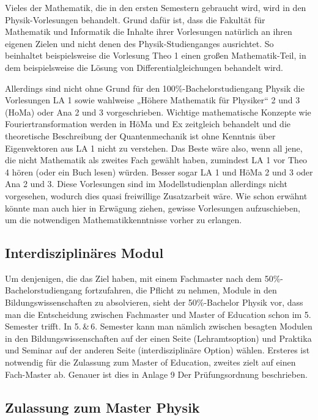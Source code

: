 Vieles der Mathematik, die in den ersten Semestern gebraucht wird, wird in den Physik-Vorlesungen behandelt. Grund dafür ist, dass die Fakultät für Mathematik und Informatik die Inhalte ihrer Vorlesungen natürlich an ihren eigenen Zielen und nicht denen des Physik-Studienganges ausrichtet. So beinhaltet beispielsweise die Vorlesung Theo 1 einen großen Mathematik-Teil, in dem beispielsweise die Lösung von Differentialgleichungen behandelt wird.

Allerdings sind nicht ohne Grund für den 100\%-Bachelorstudiengang Physik die Vorlesungen LA 1 sowie wahlweise „Höhere Mathematik für Physiker“ 2 und 3 (\gls{HoMa}) oder Ana 2 und 3 vorgeschrieben. Wichtige mathematische Konzepte wie Fouriertransformation werden in HöMa und Ex zeitgleich behandelt und die theoretische Beschreibung der Quantenmechanik ist ohne Kenntnis über Eigenvektoren aus LA 1 nicht zu verstehen. Das Beste wäre also, wenn all jene, die nicht Mathematik als zweites Fach gewählt haben, zumindest LA 1 vor Theo 4 hören (oder ein Buch lesen) würden. Besser sogar LA 1 und HöMa 2 und 3 oder Ana 2 und 3. Diese Vorlesungen sind im Modellstudienplan allerdings nicht vorgesehen, wodurch dies quasi freiwillige Zusatzarbeit wäre. Wie schon erwähnt könnte man auch hier in Erwägung ziehen, gewisse Vorlesungen aufzuschieben, um die notwendigen Mathematikkenntnisse vorher zu erlangen.


\subsection{Interdisziplinäres Modul}

Um denjenigen, die das Ziel haben, mit einem Fachmaster nach dem 50\%-Bachelorstudiengang fortzufahren, die Pflicht zu nehmen, Module in den Bildungswissenschaften zu absolvieren, sieht der 50\%-Bachelor Physik vor, dass man die Entscheidung zwischen Fachmaster und Master of Education schon im 5. Semester trifft. In 5.\,\&\,6. Semester kann man nämlich zwischen besagten Modulen in den Bildungswissenschaften auf der einen Seite (Lehramtsoption) und Praktika und Seminar auf der anderen Seite (interdisziplinäre Option) wählen. Ersteres ist notwendig für die Zulassung zum Master of Education, zweites zielt auf einen Fach-Master ab. Genauer ist dies in Anlage 9 Der Prüfungsordnung beschrieben.


\subsection{Zulassung zum Master Physik}

